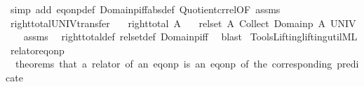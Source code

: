 \begin{isabellebody}
\ {\isacharparenleft}{\kern0pt}simp\ add{\isacharcolon}{\kern0pt}\ eq{\isacharunderscore}{\kern0pt}onp{\isacharunderscore}{\kern0pt}def\ Domainp{\isacharunderscore}{\kern0pt}iff{\isacharbrackleft}{\kern0pt}abs{\isacharunderscore}{\kern0pt}def{\isacharbrackright}{\kern0pt}\ Quotient{\isacharunderscore}{\kern0pt}cr{\isacharunderscore}{\kern0pt}rel{\isacharbrackleft}{\kern0pt}OF\ assms{\isacharbrackright}{\kern0pt}{\isacharparenright}{\kern0pt}%
\endisatagproof
{\isafoldproof}%
%
\isadelimproof
\isanewline
%
\endisadelimproof
\isanewline
{}\isamarkupfalse%
\isanewline
\isanewline
\isanewline
{}\isamarkupfalse%
\ right{\isacharunderscore}{\kern0pt}total{\isacharunderscore}{\kern0pt}UNIV{\isacharunderscore}{\kern0pt}transfer{\isacharcolon}{\kern0pt}\isanewline
\ \ \ {\isachardoublequoteopen}right{\isacharunderscore}{\kern0pt}total\ A{\isachardoublequoteclose}\isanewline
\ \ \ {\isachardoublequoteopen}{\isacharparenleft}{\kern0pt}rel{\isacharunderscore}{\kern0pt}set\ A{\isacharparenright}{\kern0pt}\ {\isacharparenleft}{\kern0pt}Collect\ {\isacharparenleft}{\kern0pt}Domainp\ A{\isacharparenright}{\kern0pt}{\isacharparenright}{\kern0pt}\ UNIV{\isachardoublequoteclose}\isanewline
%
\isadelimproof
\ \ %
\endisadelimproof
%
\isatagproof
{}\isamarkupfalse%
\ assms\ \isamarkupfalse%
\ right{\isacharunderscore}{\kern0pt}total{\isacharunderscore}{\kern0pt}def\ rel{\isacharunderscore}{\kern0pt}set{\isacharunderscore}{\kern0pt}def\ Domainp{\isacharunderscore}{\kern0pt}iff\ \isamarkupfalse%
\ blast%
\endisatagproof
{\isafoldproof}%
%
\isadelimproof
%
\endisadelimproof
%
\isadelimdocument
%
\endisadelimdocument
%
\isatagdocument
%
\isamarkuptrue%
%
\endisatagdocument
{\isafolddocument}%
%
\isadelimdocument
%
\endisadelimdocument
%
\isadelimML
%
\endisadelimML
%
\isatagML
{}\isamarkupfalse%
\ {\isacartoucheopen}Tools{\isacharslash}{\kern0pt}Lifting{\isacharslash}{\kern0pt}lifting{\isacharunderscore}{\kern0pt}util{\isachardot}{\kern0pt}ML{\isacartoucheclose}%
\endisatagML
{\isafoldML}%
%
\isadelimML
\isanewline
%
\endisadelimML
\isanewline
{}\isamarkupfalse%
\ relator{\isacharunderscore}{\kern0pt}eq{\isacharunderscore}{\kern0pt}onp\isanewline
\ \ {\isachardoublequoteopen}theorems\ that\ a\ relator\ of\ an\ eq{\isacharunderscore}{\kern0pt}onp\ is\ an\ eq{\isacharunderscore}{\kern0pt}onp\ of\ the\ corresponding\ predicate{\isachardoublequoteclose}\isanewline

\end{isabellebody}
